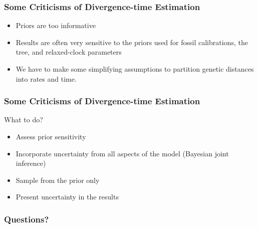 
\begin{frame}
    \frametitle{Some Criticisms of Divergence-time Estimation}
    \begin{itemize}
        \item Priors are too informative
        \item Results are often very sensitive to the priors used for
            fossil calibrations, the tree, and relaxed-clock parameters
        \item We have to make some simplifying assumptions to partition
            genetic distances into rates and time.
    \end{itemize}
\end{frame}

\begin{frame}
    \frametitle{Some Criticisms of Divergence-time Estimation}
    What to do?
    \begin{itemize}
        \item Assess prior sensitivity
        \item Incorporate uncertainty from all aspects of the model (Bayesian
            joint inference)
        \item Sample from the prior only
        \item Present uncertainty in the results
    \end{itemize}
\end{frame}

\begin{frame}
    \frametitle{Questions?}
\end{frame}



